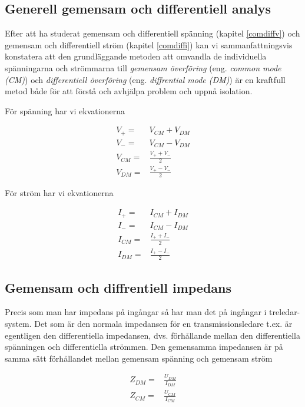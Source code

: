 \subsection{Generell gemensam och differentiell analys}
\label{comdiffgeneric}

Efter att ha studerat gemensam och differentiell spänning (kapitel \ref{comdiffv})
och gemensam och differentiell ström (kapitel \ref{comdiffi}) kan vi
sammanfattningsvis konstatera att den grundläggande metoden att omvandla
de individuella spänningarna och strömmarna till \emph{gemensam överföring}
(eng. \emph{common mode (CM)}) och \emph{differentiell överföring}
(eng. \emph{diffrential mode (DM)}) är en kraftfull metod både för att
förstå och avhjälpa problem och uppnå isolation.

För spänning har vi ekvationerna

\begin{eqnarray}
V_+ = & V_{CM} + V_{DM}\\
V_- = & V_{CM} - V_{DM}\\
V_{CM} = & \frac{V_+ + V_-}{2}\\
V_{DM} = & \frac{V_+ - V_-}{2}
\end{eqnarray}

För ström har vi ekvationerna

\begin{eqnarray}
I_+ = & I_{CM} + I_{DM}\\
I_- = & I_{CM} - I_{DM}\\
I_{CM} = & \frac{I_+ + I_-}{2}\\
I_{DM} = & \frac{I_+ - I_-}{2}
\end{eqnarray}

\subsection{Gemensam och diffrentiell impedans}

Precis som man har impedans på ingångar så har man det på ingångar i treledar-
system. Det som är den normala impedansen för en transmissionsledare t.ex. är
egentligen den differentiella impedansen, dvs. förhållande mellan den
differentiella spänningen och differentiella strömmen. Den gemensamma impedansen
är på samma sätt förhållandet mellan gemensam spänning och gemensam ström

\begin{eqnarray}
Z_{DM} = & \frac{U_{DM}}{I_{DM}}\\
Z_{CM} = & \frac{U_{CM}}{I_{CM}}
\end{eqnarray}

